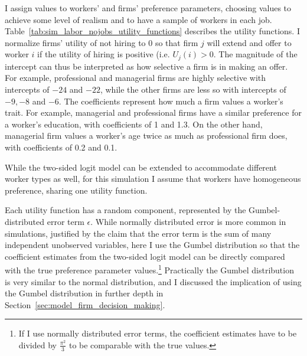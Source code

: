 I assign values to workers' and firms' preference parameters, choosing values to
achieve some level of realism and to have a sample of workers in each job.
Table~\ref{tab:sim_labor_nojobs_utility_functions} describes the utility
functions. I normalize firms' utility of not hiring to 0 so that firm $j$ will
extend and offer to worker $i$ if the utility of hiring is positive (i.e.
$U_{j}(i) > 0$. The magnitude of the intercept can thus be interpreted as how
selective a firm is in making an offer. For example, professional and managerial
firms are highly selective with intercepts of $-24$ and $-22$, while the other
firms are less so with intercepts of $-9, -8$ and $-6$. The coefficients
represent how much a firm values a worker's trait. For example, managerial and
professional firms have a similar preference for a worker's education, with
coefficients of 1 and 1.3. On the other hand, managerial firm values a worker's age twice
as much as professional firm does, with coefficients of 0.2 and 0.1.

While the two-sided logit model can be extended to accommodate different worker types as well, for
this simulation I assume that workers have homogeneous preference, sharing one
utility function.

Each utility function has a random component, represented by the
Gumbel-distributed error term $\epsilon$. While normally distributed error is
more common in simulations, justified by the claim that the error term is
the sum of many independent unobserved variables, here I use the Gumbel
distribution so that the coefficient estimates from the two-sided logit model can be
directly compared with the true preference parameter values.\footnote{If I use
  normally distributed error terms, the coefficient estimates have to be divided
by $\frac{\pi^2}{3}$ to be comparable with the true values.} Practically the
Gumbel distribution is very similar to the normal distribution, and I discussed
the implication of using the Gumbel distribution in further depth in Section~\ref{sec:model_firm_decision_making}.

